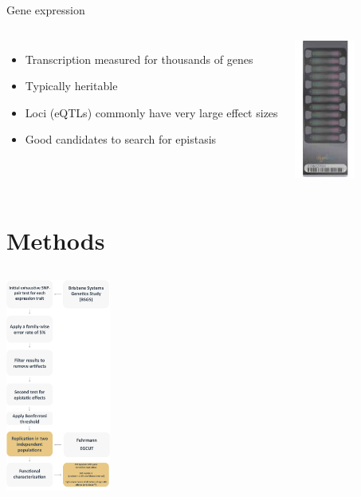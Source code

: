 \documentclass{beamer}
\begin{document}
\begin{frame}{Gene expression}
\begin{columns}[c]
\begin{itemize}
\item Transcription measured for thousands of genes
\vspace{0.3cm}
\item Typically heritable 
\vspace{0.3cm}
\item Loci (eQTLs) commonly have very large effect sizes
\vspace{0.3cm}
\item Good candidates to search for epistasis
\end{itemize}
\begin{center}
\includegraphics[width=2.0cm]{images/ht12.png}
\end{center}
\end{columns}
\end{frame}





\section{Methods}
\subsection{}
\begin{frame}
\begin{center}
\includegraphics[height=7cm]{images/methods1.png} \\
\end{center}
\end{frame}
\end{document}
